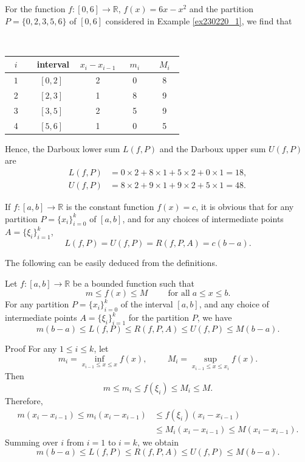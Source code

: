 \begin{example}[label=ex230220_2]{}
For the   function $f:[0, 6]\to\mathbb{R}$, $f(x)=6x-x^2$  and the partition  $P=\{0, 2, 3, 5, 6\}$ of $[0, 6]$ considered in Example \ref{ex230220_1}, we find that

\vspace{0.5cm} ~\hspace{1.5cm}
\begin{tabular}{||c||c|c|c|c||}
\hline
\hline
$i$ &$\;$ interval$\;$ & $x_i-x_{i-1}$ & $m_i$ & $M_i$\\
\hline
\hline
$\;\;1\;\;$ & $[0,2]$ & 2&$\quad 0\quad $ & $\quad 8\quad $\\
\hline
2 & $[2,3]$ &1& 8 & 9\\
\hline
3 & $[3, 5]$ &2&  5&9\\
\hline 
4 & $[5, 6]$ &1& 0 & 5\\
\hline

\hline

\end{tabular}

\vspace{0.5cm}
Hence, the Darboux lower sum $L(f,P)$ and the Darboux upper sum $U(f,P)$ are
\begin{align*}
L(f,P)&=0\times 2+8\times 1+5\times 2+0\times   1=18,\\
U(f,P)&=8\times 2+9\times 1+9\times 2+5\times   1= 48.
\end{align*}
\end{example}
 


\begin{example}{}
If $f:[a,b]\to\mathbb{R}$ is the constant function $f(x)=c$, it is obvious that for any partition $P=\{x_i\}_{i=0}^k$ of $[a,b]$, and for any choices of intermediate points $A=\{\xi_i\}_{i=1}^k$,
\[L(f,P)=U(f,P)=R(f,P,A)=c(b-a).\]
\end{example}

The following can be easily deduced  from the definitions.
\begin{proposition}[label=230304_6]{}
Let $f:[a,b]\to\mathbb{R}$ be a bounded function such that
\[m\leq f(x)\leq M\hspace{1cm}\text{for all}\;a\leq x\leq b.\] For any partition $P=\{x_i\}_{i=0}^k$ of the interval $[a,b]$, and any  choice of intermediate points  $A=\{\xi_i\}_{i=1}^k$ for the partition $P$, we have
\[m(b-a)\leq L(f,P)\leq R(f,P,A)\leq U(f,P)\leq M(b-a).\]
\end{proposition}
\begin{myproof}{Proof}
For any $1\leq i\leq k$, let
\[m_i=\inf_{x_{i-1}\leq x\leq x}f(x),\hspace{1cm}
M_i =\sup_{x_{i-1}\leq x\leq x_i}f(x).\]Then 
\[m\leq m_i\leq f(\xi_i)\leq M_i\leq M.\] Therefore,
\begin{align*}
m(x_i-x_{i-1}) \leq m_i(x_i-x_{i-1})&\leq f(\xi_i)(x_i-x_{i-1})\\&\leq M_i(x_i-x_{i-1})\leq M(x_i-x_{i-1}).\end{align*}
Summing over $i$ from $i=1$ to $i=k$, we obtain
\[m(b-a)\leq L(f,P)\leq R(f,P,A)\leq U(f,P)\leq M(b-a).\]
\end{myproof}

